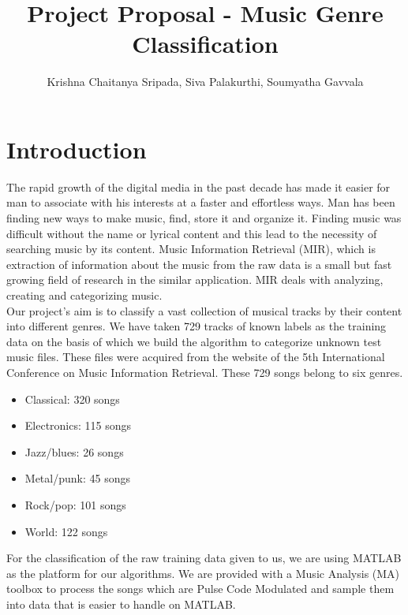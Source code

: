 \documentclass[12pt]{article}
\begin{document}
                                   
\title{Project Proposal  - Music Genre Classification\\}
\author{Krishna Chaitanya Sripada, Siva Palakurthi, Soumyatha Gavvala}
\maketitle
\section{Introduction}
\begin{flushleft}
The rapid growth of the digital media in the past decade has made it easier for man to associate with his interests at a faster and effortless ways. Man has been finding new ways to make music, find, store it and organize it. Finding music was difficult without the name or lyrical content and this lead to the necessity of searching music by its content. Music Information Retrieval (MIR), which is extraction of information about the music from the raw data is a small but fast growing field of research in the similar application. MIR deals with analyzing, creating and categorizing music.\\
\vspace{0.5em}
Our project's aim is to classify a vast collection of musical tracks by their content into different genres. We have taken 729 tracks of known labels as the training data on the basis of which we build the algorithm to categorize unknown test music files. These files were acquired from the website of the 5th International Conference on Music Information Retrieval. These 729 songs belong to six genres.\\
\vspace{0.5em}
\begin{itemize}
\item Classical: 320 songs
\item Electronics: 115 songs
\item Jazz/blues: 26 songs
\item Metal/punk: 45 songs
\item Rock/pop: 101 songs
\item World: 122 songs
\end{itemize}
For the classification of the raw training data given to us, we are using MATLAB as the platform for our algorithms. We are provided with a Music Analysis (MA) toolbox to process the songs which are Pulse Code Modulated and sample them into data that is easier to handle on MATLAB.\\

\end{flushleft}
\end{document}
